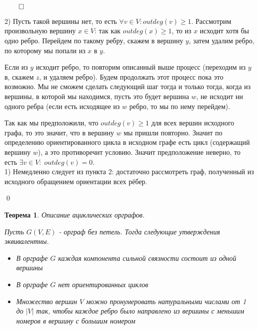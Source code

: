 \documentclass[a4paper,12pt,leqno]{article}
\theoremstyle{plain} %
\newtheorem{theorem}{Теорема}
\theoremstyle{definition} %
\renewenvironment{proof}{$\qed$}{{\qed}} %
\begin{document}
\begin{proof}

2) Пусть такой вершины нет, то есть $\forall v \in V: outdeg(v) \geq 1$. Рассмотрим произвольную вершину $x \in V$: так как $outdeg(x) \geq 1$, то из $x$ исходит хотя бы одно ребро. Перейдем по такому ребру, скажем в вершину $y$, затем удалим ребро, по которому мы попали из $x$ в $y$. 

Если из $y$ исходит ребро, то повторим описанный выше процесс (переходим из $y$ в, скажем $z$, и удаляем ребро). Будем продолжать этот процесс пока это возможно. Мы не сможем сделать следующий шаг тогда и только тогда, когда из вершины, в которой мы находимся, пусть это будет вершина $w$, не исходит ни одного ребра (если есть исходящее из $w$ ребро, то мы по нему перейдем). 

Так как мы предположили, что $outdeg(v) \geq 1$ для всех вершин исходного графа, то это значит, что в вершину $w$ мы пришли повторно. Значит по определению ориентированного цикла в исходном графе есть цикл (содержащий вершину $w$), а это противоречит условию. Значит предположение неверно, то есть $\exists v \in V: \; outdeg(v) = 0$. \\

1) Немедленно следует из пункта 2: достаточно рассмотреть граф, полученный из исходного обращением ориентации всех рёбер. 

\end{proof}

\begin{theorem}\textit{Описание ациклических орграфов.}

Пусть $G(V, E)$ - орграф без петель. Тогда следующие утверждения эквивалентны.

\begin{itemize}
    \item[1)] В орграфе $G$ каждая компонента сильной связности состоит из одной вершины
    
    \item[2)] В орграфе $G$ нет ориентированных циклов
    
    \item[3)] Множество вершин $V$ можно пронумеровать натуральными числами от 1 до $|V|$ так, чтобы каждое ребро было направлено из вершины с меньшим номеров в вершину с большим номером
\end{itemize}

\end{theorem}
\end{document}
